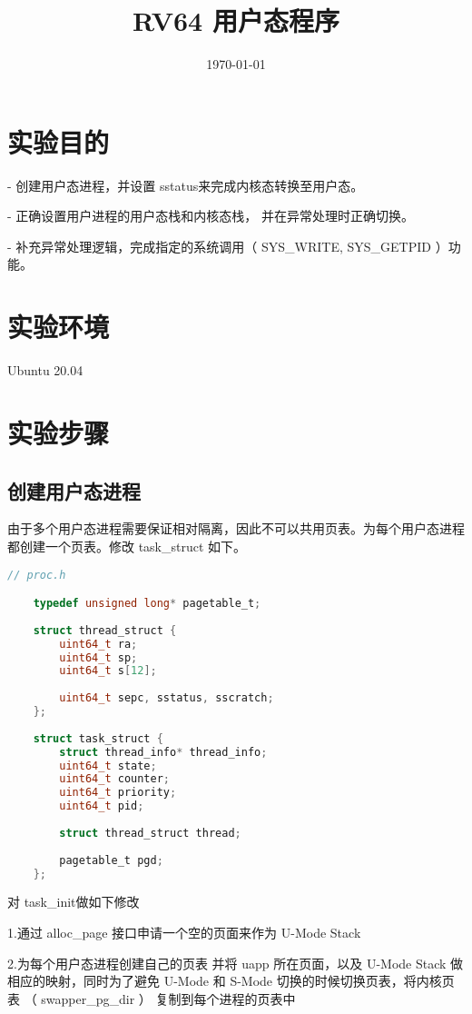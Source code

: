\documentclass{source/Report}
\title{RV64 用户态程序}
\date{\today}
\begin{document}
\makecover
\makeheader
\section{实验目的}

- 创建用户态进程，并设置 sstatus来完成内核态转换至用户态。

- 正确设置用户进程的用户态栈和内核态栈， 并在异常处理时正确切换。

- 补充异常处理逻辑，完成指定的系统调用（ SYS\_WRITE, SYS\_GETPID ）功能。

\section{实验环境}
Ubuntu 20.04

\section{实验步骤}
\subsection{创建用户态进程}

由于多个用户态进程需要保证相对隔离，因此不可以共用页表。为每个用户态进程都创建一个页表。修改 task\_struct 如下。

\begin{lstlisting}[language = c, title = {task\_struct}]
    // proc.h 

    typedef unsigned long* pagetable_t;
    
    struct thread_struct {
        uint64_t ra;
        uint64_t sp;                     
        uint64_t s[12];
    
        uint64_t sepc, sstatus, sscratch; 
    };
    
    struct task_struct {
        struct thread_info* thread_info;
        uint64_t state;
        uint64_t counter;
        uint64_t priority;
        uint64_t pid;
    
        struct thread_struct thread;
    
        pagetable_t pgd;
    };
\end{lstlisting}

对 task\_init做如下修改

1.通过 alloc\_page 接口申请一个空的页面来作为 U-Mode Stack

2.为每个用户态进程创建自己的页表 并将 uapp 所在页面，以及 U-Mode Stack 做相应的映射，同时为了避免 U-Mode 和 S-Mode 切换的时候切换页表，将内核页表 （ swapper\_pg\_dir ） 复制到每个进程的页表中
\end{document}
